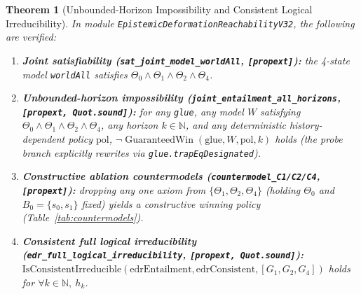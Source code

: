 \documentclass[10pt,a4paper]{article}
\theoremstyle{cleanthm}
\newtheorem{theorem}{Theorem}[section]
\theoremstyle{cleandef}
\DeclareMathOperator{\GuaranteedWin}{GuaranteedWin}
\begin{document}
\begin{theorem}[Unbounded-Horizon Impossibility and Consistent Logical Irreducibility]
\label{thm:joint_and_irr}
In module \texttt{EpistemicDeformationReachabilityV32}, the following are verified:
\begin{enumerate}
  \item \textbf{Joint satisfiability (\texttt{sat\_\allowbreak joint\_\allowbreak model\_\allowbreak worldAll}, \texttt{[propext]}):} the 4-state model \texttt{worldAll} satisfies $\Theta_0\land\Theta_1\land\Theta_2\land\Theta_4$.
  \item \textbf{Unbounded-horizon impossibility (\texttt{joint\_\allowbreak entailment\_\allowbreak all\_\allowbreak horizons}, \texttt{[propext, Quot.sound]}):} for \emph{any} \texttt{glue}, \emph{any} model $W$ satisfying $\Theta_0\land\Theta_1\land\Theta_2\land\Theta_4$, \emph{any} horizon $k\in\mathbb{N}$, and \emph{any} deterministic history-dependent policy $\mathrm{pol}$, $\neg\GuaranteedWin(\mathrm{glue},W,\mathrm{pol},k)$ holds (the probe branch explicitly rewrites via \texttt{glue.trapEqDesignated}).
  \item \textbf{Constructive ablation countermodels (\texttt{countermodel\_\allowbreak C1/C2/C4}, \texttt{[propext]}):} dropping any one axiom from $\{\Theta_1,\Theta_2,\Theta_4\}$ (holding $\Theta_0$ and $B_0=\{s_0,s_1\}$ fixed) yields a constructive winning policy (Table~\ref{tab:countermodels}).
  \item \textbf{Consistent full logical irreducibility (\texttt{edr\_\allowbreak full\_\allowbreak logical\_\allowbreak irreducibility}, \texttt{[propext, Quot.sound]}):} $\mathrm{IsConsistentIrreducible}(\allowbreak\mathrm{edrEntailment},\allowbreak\mathrm{edrConsistent},\allowbreak [G_1,G_2,G_4])$ holds for $\forall k\in\mathbb{N},\ h_k$.
\end{enumerate}
\end{theorem}
\end{document}
